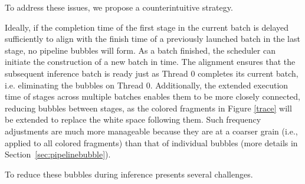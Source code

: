 To address these issues, we propose a counterintuitive strategy.


Ideally, if the completion time of the first stage in the current batch is delayed sufficiently to align with the finish time of a previously launched batch in the last stage, no pipeline bubbles will form. 
As a batch finished, the scheduler can initiate the construction of a new batch in time.
The alignment ensures that the subsequent inference batch is ready just as Thread 0 completes its current batch, i.e. eliminating the bubbles on Thread 0.
Additionally, the extended execution time of stages across multiple batches enables them to be more closely connected, reducing bubbles between stages, as the colored fragments in Figure \ref{trace} will be extended to replace the white space following them.
Such frequency adjustments are much more manageable because they are at a coarser grain (i.e., applied to all colored fragments) than that of individual bubbles (more details in Section~\ref{sec:pipelinebubble}).


To reduce these bubbles during inference presents several challenges.

